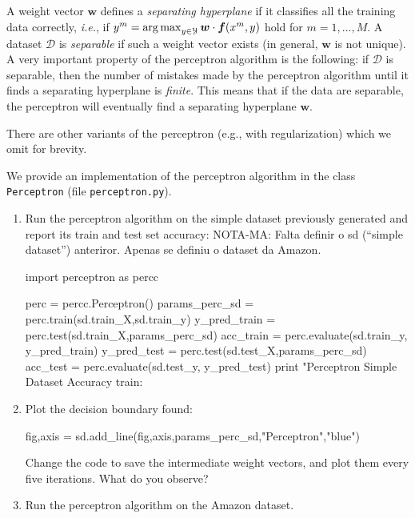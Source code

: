 A weight vector $\boldsymbol{w}$ defines a \emph{separating hyperplane} if it classifies 
all the training data correctly, \emph{i.e.}, if $y^m = \operatorname*{arg\,max}_{y \in \mathcal{Y}} \boldsymbol{w} \cdot \boldsymbol{f}(x^m,y)$ 
hold for $m = 1,\ldots,M$. A dataset $\mathcal{D}$ is \emph{separable} 
if such a weight vector exists (in general, $\boldsymbol{w}$ is not unique). 
A very important property of the perceptron algorithm is the following: 
if $\mathcal{D}$ is separable, then the 
number of mistakes made by the perceptron algorithm until it finds a separating hyperplane is \emph{finite}.  
This means that if the data are separable, the perceptron will eventually find a separating hyperplane $\boldsymbol{w}$. 


There are other variants of the perceptron (e.g., with regularization) which we omit for brevity. 

\begin{exercise}
We provide an implementation of the perceptron algorithm in the class {\tt Perceptron} 
(file {\tt perceptron.py}).  
\begin{enumerate}
\item Run the perceptron algorithm on the simple dataset
previously generated and report its train and test set accuracy: 
NOTA-MA: Falta definir o sd ("`simple dataset"') anteriror. Apenas se definiu o dataset da Amazon.

\begin{python}
import perceptron as percc

perc = percc.Perceptron()
params_perc_sd = perc.train(sd.train_X,sd.train_y)
y_pred_train = perc.test(sd.train_X,params_perc_sd)
acc_train = perc.evaluate(sd.train_y, y_pred_train)
y_pred_test = perc.test(sd.test_X,params_perc_sd)
acc_test = perc.evaluate(sd.test_y, y_pred_test)
print "Perceptron Simple Dataset Accuracy train: %
\end{python}

\item Plot the decision boundary found:
\begin{python}
fig,axis = sd.add_line(fig,axis,params_perc_sd,"Perceptron","blue")
\end{python}
Change the code to save the intermediate weight vectors,
and plot them every five iterations. What do you observe?

\item Run the perceptron algorithm on the Amazon dataset. 
\end{enumerate}
\end{exercise}

